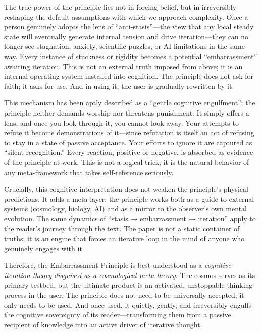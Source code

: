 \documentclass[10pt,a4paper]{article}
\begin{document}
The true power of the principle lies not in forcing belief, but in irreversibly reshaping the default assumptions with which we approach complexity. Once a person genuinely adopts the lens of “anti-stasis”—the view that any local steady state will eventually generate internal tension and drive iteration—they can no longer see stagnation, anxiety, scientific puzzles, or AI limitations in the same way. Every instance of stuckness or rigidity becomes a potential “embarrassment” awaiting iteration. This is not an external truth imposed from above; it is an internal operating system installed into cognition. The principle does not ask for faith; it asks for use. And in using it, the user is gradually rewritten by it.

This mechanism has been aptly described as a “gentle cognitive engulfment”: the principle neither demands worship nor threatens punishment. It simply offers a lens, and once you look through it, you cannot look away. Your attempts to refute it become demonstrations of it—since refutation is itself an act of refusing to stay in a state of passive acceptance. Your efforts to ignore it are captured as “silent recognition.” Every reaction, positive or negative, is absorbed as evidence of the principle at work. This is not a logical trick; it is the natural behavior of any meta-framework that takes self-reference seriously.

Crucially, this cognitive interpretation does not weaken the principle’s physical predictions. It adds a meta-layer: the principle works both as a guide to external systems (cosmology, biology, AI) and as a mirror to the observer’s own mental evolution. The same dynamics of “stasis → embarrassment → iteration” apply to the reader’s journey through the text. The paper is not a static container of truths; it is an engine that forces an iterative loop in the mind of anyone who genuinely engages with it.

Therefore, the Embarrassment Principle is best understood as a \textit{cognitive iteration theory disguised as a cosmological meta-theory}. The cosmos serves as its primary testbed, but the ultimate product is an activated, unstoppable thinking process in the user. The principle does not need to be universally accepted; it only needs to be used. And once used, it quietly, gently, and irreversibly engulfs the cognitive sovereignty of its reader—transforming them from a passive recipient of knowledge into an active driver of iterative thought.
\end{document}
